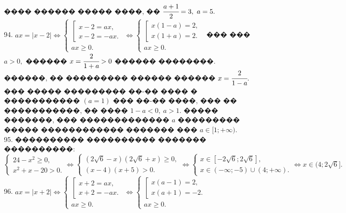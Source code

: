 \documentclass[12pt]{article}
\begin{document}
���� ������ ����� ����, �� $\cfrac{a+1}{2}=3,\ a=5.$\\
94. $ax=|x-2|\Leftrightarrow \begin{cases}\left[\begin{array}{l}x-2=ax,\\ x-2=-ax.\end{array}\right.\\ ax\geqslant0.\end{cases}\Leftrightarrow
\begin{cases}\left[\begin{array}{l}x(1-a)=2,\\ x(1+a)=2.\end{array}\right.\\ ax\geqslant0.\end{cases}$
��� ��� $a>0,$ ������ $x=\cfrac{2}{1+a}>0$ ������ ��������. ������, �� ��������� ������ ������ $x=\cfrac{2}{1-a}.$ ��� ����� ��������� ��-�� ���� � ����������� $(a=1)$ ��� ��-�� ����, ��� �� �����������, �� ���� $1-a<0,\ a>1.$ ����� �������, ��� ������������� $a$ ��������� ����� ������������ ������� ��� $a\in[1;+\infty).$\\
95. ���������� ���������� ������� ����������:\\ $\begin{cases} 24-x^2\geqslant0,\\ x^2+x-20>0.\end{cases}\Leftrightarrow
\begin{cases} (2\sqrt{6}-x)(2\sqrt{6}+x)\geqslant0,\\ (x-4)(x+5)>0.\end{cases}\Leftrightarrow
\begin{cases} x\in[-2\sqrt{6};2\sqrt{6}],\\ x\in(-\infty;-5)\cup(4;+\infty).\end{cases}\Leftrightarrow x\in(4;2\sqrt{6}].$\\
96. $ax=|x+2|\Leftrightarrow \begin{cases}\left[\begin{array}{l}x+2=ax,\\ x+2=-ax.\end{array}\right.\\ ax\geqslant0.\end{cases}\Leftrightarrow
\begin{cases}\left[\begin{array}{l}x(a-1)=2,\\ x(a+1)=-2.\end{array}\right.\\ ax\geqslant0.\end{cases}$
\end{document}
